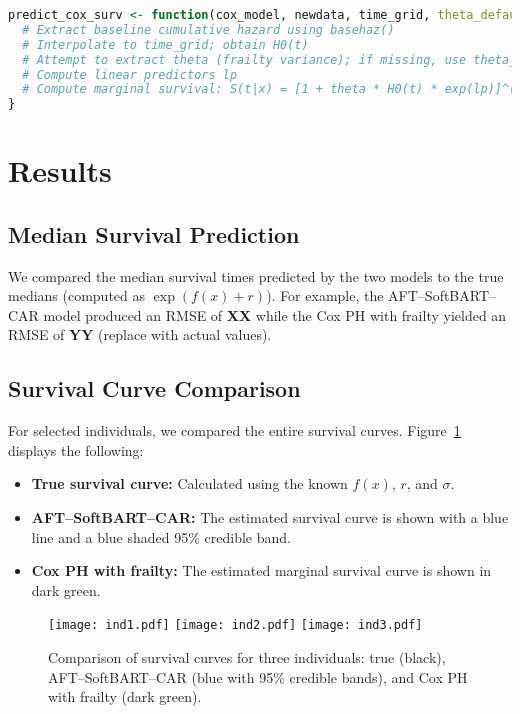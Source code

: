 \documentclass[useAMS,referee]{biom}
\begin{document}
\begin{lstlisting}[language=R, caption={Prediction for Cox PH with Frailty model}]
predict_cox_surv <- function(cox_model, newdata, time_grid, theta_default = 0.5){
  # Extract baseline cumulative hazard using basehaz()
  # Interpolate to time_grid; obtain H0(t)
  # Attempt to extract theta (frailty variance); if missing, use theta_default
  # Compute linear predictors lp
  # Compute marginal survival: S(t|x) = [1 + theta * H0(t) * exp(lp)]^(-1/theta)
}
\end{lstlisting}

\section{Results}
\subsection{Median Survival Prediction}
We compared the median survival times predicted by the two models to the true medians (computed as $\exp(f(x) + r)$). For example, the AFT--SoftBART--CAR model produced an RMSE of \textbf{XX} while the Cox PH with frailty yielded an RMSE of \textbf{YY} (replace with actual values).

\subsection{Survival Curve Comparison}
For selected individuals, we compared the entire survival curves. Figure~\ref{fig:surv_curves} displays the following:
\begin{itemize}
    \item \textbf{True survival curve:} Calculated using the known $f(x)$, $r$, and $\sigma$.
    \item \textbf{AFT--SoftBART--CAR:} The estimated survival curve is shown with a blue line and a blue shaded 95\% credible band.
    \item \textbf{Cox PH with frailty:} The estimated marginal survival curve is shown in dark green.
\end{itemize}

\begin{figure}[ht]
\centering
\texttt{[image: ind1.pdf]}
\texttt{[image: ind2.pdf]}
\texttt{[image: ind3.pdf]}
\caption{Comparison of survival curves for three individuals: true (black), AFT--SoftBART--CAR (blue with 95\% credible bands), and Cox PH with frailty (dark green).}
\label{fig:surv_curves}
\end{figure}
\end{document}
